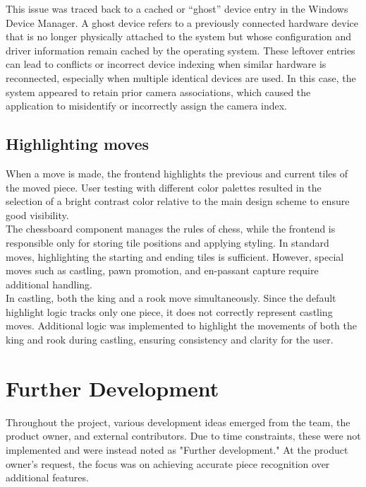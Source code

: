 This issue was traced back to a cached or “ghost” device entry in the Windows Device Manager. A ghost device refers to a previously connected hardware device that is no longer physically attached to the system but whose configuration and driver information remain cached by the operating system. These leftover entries can lead to conflicts or incorrect device indexing when similar hardware is reconnected, especially when multiple identical devices are used. In this case, the system appeared to retain prior camera associations, which caused the application to misidentify or incorrectly assign the camera index.

\subsection{Highlighting moves}
When a move is made, the frontend highlights the previous and current tiles of the moved piece. User testing with different color palettes resulted in the selection of a bright contrast color relative to the main design scheme to ensure good visibility. \\

The chessboard component manages the rules of chess, while the frontend is responsible only for storing tile positions and applying styling. In standard moves, highlighting the starting and ending tiles is sufficient. However, special moves such as \gls{castling}, pawn \gls{promotion}, and \gls{en-passant} capture require additional handling. \\

In \gls{castling}, both the king and a rook move simultaneously. Since the default highlight logic tracks only one piece, it does not correctly represent \gls{castling} moves. Additional logic was implemented to highlight the movements of both the king and rook during \gls{castling}, ensuring consistency and clarity for the user.







\section{Further Development}
Throughout the project, various development ideas emerged from the team, the product owner, and external contributors. Due to time constraints, these were not implemented and were instead noted as "Further development." At the product owner's request, the focus was on achieving accurate piece recognition over additional features.

